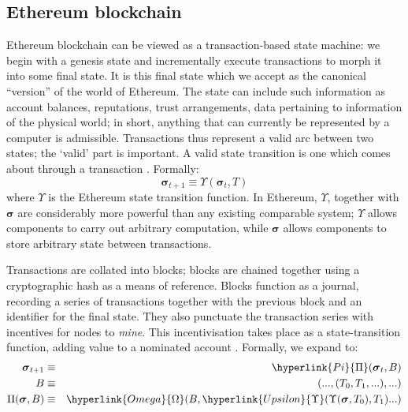 \documentclass{isprs} %
\begin{document}
\sloppy

\subsection{Ethereum blockchain}\label{sec:Ethereum blockchain}

Ethereum blockchain can be viewed as a transaction-based state machine: we begin with a genesis state and incrementally execute transactions to morph it into some final state. It is this final state which we accept as the canonical “version” of the world of Ethereum. The state can include such information as account balances, reputations, trust arrangements, data pertaining to information of the physical world; in short, anything that can currently be represented by a computer is admissible. Transactions thus represent a valid arc between two states; the ‘valid’ part is important. A valid state transition is one which comes about through a transaction \cite{wood2014ethereum}. Formally:
\begin{equation}
\boldsymbol{\sigma}_{t+1} \equiv \Upsilon(\boldsymbol{\sigma}_{t}, T)
\end{equation}
where $\Upsilon$ is the Ethereum state transition function. In Ethereum, $\Upsilon$, together with $\boldsymbol{\sigma}$ are considerably more powerful than any existing comparable system; $\Upsilon$ allows components to carry out arbitrary computation, while $\boldsymbol{\sigma}$ allows components to store arbitrary state between transactions.

Transactions are collated into blocks; blocks are chained together using a cryptographic hash as a means of reference. Blocks function as a journal, recording a series of transactions together with the previous block and an identifier for the final state. They also punctuate the transaction series with incentives for nodes to \textit{mine}. This incentivisation takes place as a state-transition function, adding value to a nominated account \cite{wood2014ethereum}. Formally, we expand to:
\begin{eqnarray}
\boldsymbol{\sigma}_{t+1} & \equiv & \hyperlink{Pi}{\Pi}(\boldsymbol{\sigma}_{t}, B) \\
B & \equiv & (..., (T_0, T_1, ...), ...) \\
\Pi(\boldsymbol{\sigma}, B) & \equiv & \hyperlink{Omega}{\Omega}(B, \hyperlink{Upsilon}{\Upsilon}(\Upsilon(\boldsymbol{\sigma}, T_0), T_1) ...)
\end{eqnarray}
\end{document}
